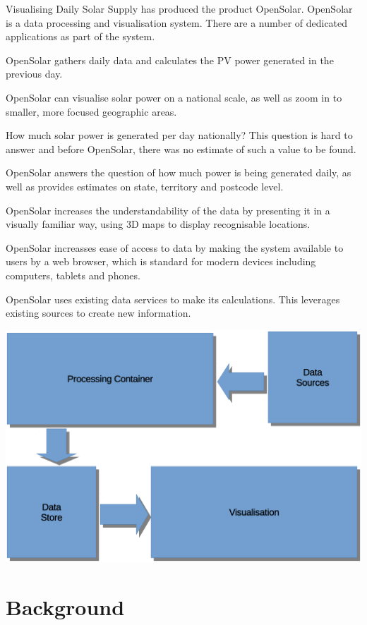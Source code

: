 \documentclass[10pt, a4paper]{article}
\begin{document}
\begin{multicols}{2}

Visualising Daily Solar Supply has produced the product OpenSolar. OpenSolar is a data processing and visualisation system. There are a number of dedicated applications as part of the system.

OpenSolar gathers daily data and calculates the PV power generated in the previous day.

OpenSolar can visualise solar power on a national scale, as well as zoom in to smaller, more focused geographic areas.

How much solar power is generated per day nationally? This question is hard to answer and before OpenSolar, there was no estimate of such a value to be found.

OpenSolar answers the question of how much power is being generated daily, as well as provides estimates on state, territory and postcode level.

OpenSolar increases the understandability of the data by presenting it in a visually familiar way, using 3D maps to display recognisable locations.

OpenSolar increasses ease of access to data by making the system available to users by a web browser, which is standard for modern devices including computers, tablets and phones.

OpenSolar uses existing data services to make its calculations. This leverages existing sources to create new information.

\includegraphics[scale=0.17]{design1.eps}

\section{Background}


\end{multicols}
\end{document}
